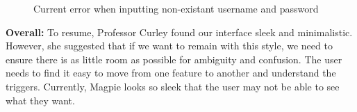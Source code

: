 \documentclass{report}
\begin{document}
\begin{figure}
    \centering
    \caption{Current error when inputting non-existant username and password}
    \label{fig:plot16}
\end{figure}
\textbf{Overall: }
To resume, Professor Curley found our interface sleek and minimalistic. However, she suggested that if we want to remain with this style, we need to ensure there is as little room as possible for ambiguity and confusion. The user needs to find it easy to move from one feature to another and understand the triggers. Currently, Magpie looks so sleek that the user may not be able to see what they want.\\ \\
\end{document}
